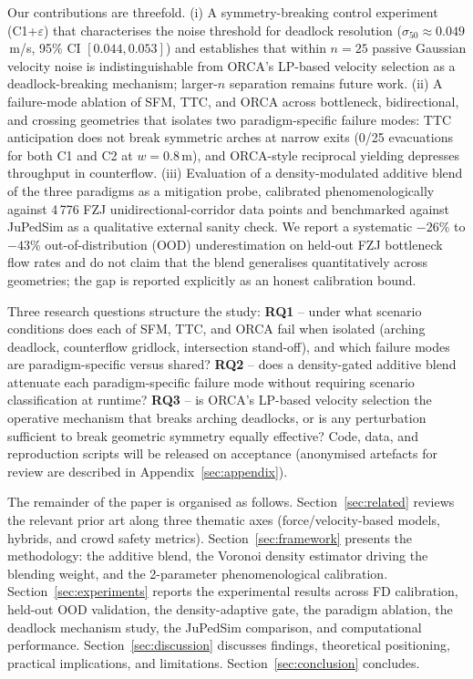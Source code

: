 \documentclass[a4paper,twoside]{article}
\begin{document}
Our contributions are threefold. (i) A symmetry-breaking control experiment (C1+$\varepsilon$) that characterises the noise threshold for deadlock resolution ($\sigma_{50} \approx 0.049$\,m/s, 95\% CI $[0.044, 0.053]$) and establishes that within $n = 25$ passive Gaussian velocity noise is indistinguishable from ORCA's LP-based velocity selection as a deadlock-breaking mechanism; larger-$n$ separation remains future work. (ii) A failure-mode ablation of SFM, TTC, and ORCA across bottleneck, bidirectional, and crossing geometries that isolates two paradigm-specific failure modes: TTC anticipation does not break symmetric arches at narrow exits (0/25 evacuations for both C1 and C2 at $w=0.8$\,m), and ORCA-style reciprocal yielding depresses throughput in counterflow. (iii) Evaluation of a density-modulated additive blend of the three paradigms as a mitigation probe, calibrated phenomenologically against 4\,776 FZJ unidirectional-corridor data points and benchmarked against JuPedSim as a qualitative external sanity check. We report a systematic $-26\%$ to $-43\%$ out-of-distribution (OOD) underestimation on held-out FZJ bottleneck flow rates and do not claim that the blend generalises quantitatively across geometries; the gap is reported explicitly as an honest calibration bound.

Three research questions structure the study: \textbf{RQ1} -- under what scenario conditions does each of SFM, TTC, and ORCA fail when isolated (arching deadlock, counterflow gridlock, intersection stand-off), and which failure modes are paradigm-specific versus shared? \textbf{RQ2} -- does a density-gated additive blend attenuate each paradigm-specific failure mode without requiring scenario classification at runtime? \textbf{RQ3} -- is ORCA's LP-based velocity selection the operative mechanism that breaks arching deadlocks, or is any perturbation sufficient to break geometric symmetry equally effective? Code, data, and reproduction scripts will be released on acceptance (anonymised artefacts for review are described in Appendix~\ref{sec:appendix}).

The remainder of the paper is organised as follows. Section~\ref{sec:related} reviews the relevant prior art along three thematic axes (force/velocity-based models, hybrids, and crowd safety metrics). Section~\ref{sec:framework} presents the methodology: the additive blend, the Voronoi density estimator driving the blending weight, and the 2-parameter phenomenological calibration. Section~\ref{sec:experiments} reports the experimental results across FD calibration, held-out OOD validation, the density-adaptive gate, the paradigm ablation, the deadlock mechanism study, the JuPedSim comparison, and computational performance. Section~\ref{sec:discussion} discusses findings, theoretical positioning, practical implications, and limitations. Section~\ref{sec:conclusion} concludes.
\end{document}
